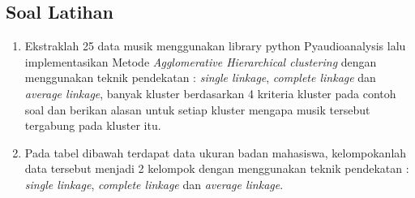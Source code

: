 \subsection{Soal Latihan}
\begin{enumerate}
    \item Ekstraklah 25 data musik menggunakan library python Pyaudioanalysis lalu implementasikan Metode \textit{Agglomerative Hierarchical clustering} dengan menggunakan teknik pendekatan : \textit{single linkage}, \textit{complete linkage} dan \textit{ average linkage}, banyak kluster berdasarkan 4 kriteria kluster pada contoh soal dan berikan alasan untuk setiap kluster mengapa musik tersebut tergabung pada kluster itu.
    \item Pada tabel dibawah terdapat data ukuran badan mahasiswa, kelompokanlah data tersebut menjadi 2 kelompok dengan menggunakan teknik pendekatan : \textit{single linkage}, \textit{complete linkage} dan \textit{ average linkage}. 
\begin{table}[htbp]

\label{tab:my-table}
\end{table}
\end{enumerate}
